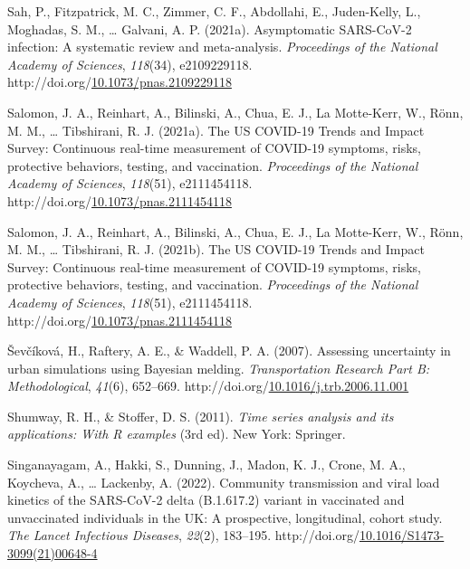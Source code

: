 \documentclass[12pt,twoside]{smiththesis}
\newlength{\cslhangindent}
\newenvironment{CSLReferences}[2] %
 {%
\setlength{\parindent}{0pt}
\ifodd #1 \everypar{\setlength{\hangindent}{\cslhangindent}}\ignorespaces\fi
\ifnum #2 > 0
\setlength{\parskip}{#2\baselineskip}
  \fi
}%
{}
\begin{document}
\begin{CSLReferences}{1}{0}
\leavevmode{}%
Sah, P., Fitzpatrick, M. C., Zimmer, C. F., Abdollahi, E., Juden-Kelly, L., Moghadas, S. M., \ldots{} Galvani, A. P. (2021a). Asymptomatic {SARS-CoV-2} infection: {A} systematic review and meta-analysis. \emph{Proceedings of the National Academy of Sciences}, \emph{118}(34), e2109229118. http://doi.org/\href{https://doi.org/10.1073/pnas.2109229118}{10.1073/pnas.2109229118}

\leavevmode{}%
Salomon, J. A., Reinhart, A., Bilinski, A., Chua, E. J., La Motte-Kerr, W., Rönn, M. M., \ldots{} Tibshirani, R. J. (2021a). The {US COVID-19 Trends} and {Impact Survey}: {Continuous} real-time measurement of {COVID-19} symptoms, risks, protective behaviors, testing, and vaccination. \emph{Proceedings of the National Academy of Sciences}, \emph{118}(51), e2111454118. http://doi.org/\href{https://doi.org/10.1073/pnas.2111454118}{10.1073/pnas.2111454118}

\leavevmode{}%
Salomon, J. A., Reinhart, A., Bilinski, A., Chua, E. J., La Motte-Kerr, W., Rönn, M. M., \ldots{} Tibshirani, R. J. (2021b). The {US COVID-19 Trends} and {Impact Survey}: {Continuous} real-time measurement of {COVID-19} symptoms, risks, protective behaviors, testing, and vaccination. \emph{Proceedings of the National Academy of Sciences}, \emph{118}(51), e2111454118. http://doi.org/\href{https://doi.org/10.1073/pnas.2111454118}{10.1073/pnas.2111454118}

\leavevmode{}%
Ševčíková, H., Raftery, A. E., \& Waddell, P. A. (2007). Assessing uncertainty in urban simulations using {Bayesian} melding. \emph{Transportation Research Part B: Methodological}, \emph{41}(6), 652--669. http://doi.org/\href{https://doi.org/10.1016/j.trb.2006.11.001}{10.1016/j.trb.2006.11.001}

\leavevmode{}%
Shumway, R. H., \& Stoffer, D. S. (2011). \emph{Time series analysis and its applications: With {R} examples} (3rd ed). {New York}: {Springer}.

\leavevmode{}%
Singanayagam, A., Hakki, S., Dunning, J., Madon, K. J., Crone, M. A., Koycheva, A., \ldots{} Lackenby, A. (2022). Community transmission and viral load kinetics of the {SARS-CoV-2} delta ({B}.1.617.2) variant in vaccinated and unvaccinated individuals in the {UK}: A prospective, longitudinal, cohort study. \emph{The Lancet Infectious Diseases}, \emph{22}(2), 183--195. http://doi.org/\href{https://doi.org/10.1016/S1473-3099(21)00648-4}{10.1016/S1473-3099(21)00648-4}


\end{CSLReferences}
\end{document}
